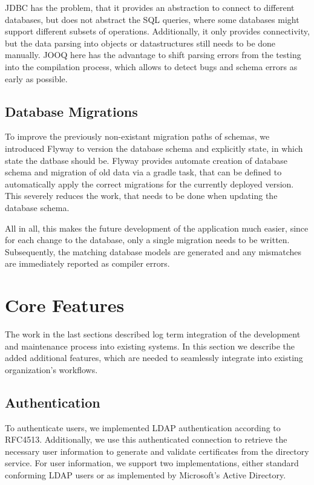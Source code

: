 JDBC has the problem, that it provides an abstraction to connect to different databases, but does not abstract the
SQL queries, where some databases might support different subsets of operations.
Additionally, it only provides connectivity, but the data parsing into objects or datastructures still needs to be done
manually.
JOOQ here has the advantage to shift parsing errors from the testing into the compilation process, which allows to
detect bugs and schema errors as early as possible.

\subsection*{Database Migrations}
To improve the previously non-existant migration paths of schemas, we introduced Flyway to version the database schema
and explicitly state, in which state the datbase should be.
Flyway provides automate creation of database schema and migration of old data via a gradle task, that can be defined to
automatically apply the correct migrations for the currently deployed version.
This severely reduces the work, that needs to be done when updating the database schema.

All in all, this makes the future development of the application much easier, since for each change to the database,
only a single migration needs to be written.
Subsequently, the matching database models are generated and any mismatches are immediately reported as compiler errors.

\section{Core Features}\label{sec:coreFeatures}

The work in the last sections described log term integration of the development and maintenance process into existing
systems.
In this section we describe the added additional features, which are needed to seamlessly integrate into existing
organization's workflows.

\subsection*{Authentication}
To authenticate users, we implemented LDAP authentication according to RFC4513\cite{RFC4513}.
Additionally, we use this authenticated connection to retrieve the necessary user information to generate and validate
certificates from the directory service.
For user information, we support two implementations, either standard conforming LDAP users or as implemented by
Microsoft's Active Directory.

